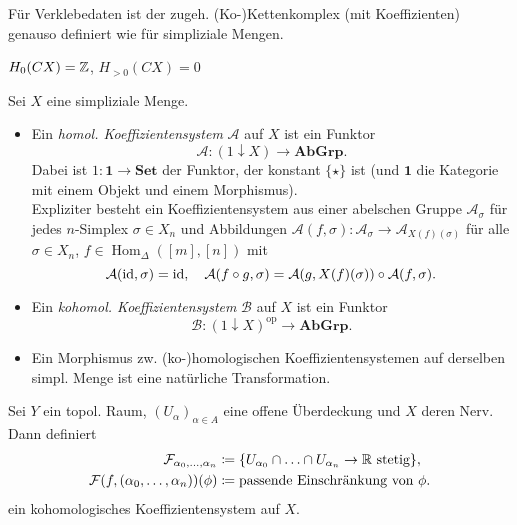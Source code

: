 \documentclass{cheat-sheet}
\newcommand{\SetC}{\mathbf{Set}} %
\newcommand{\AbGrp}{\mathbf{AbGrp}} %
\newcommand{\op}{\mathrm{op}} %
\DeclareMathOperator{\Hom}{Hom} %
\begin{document}
\begin{defn}
  Für Verklebedaten ist der zugeh. (Ko-)Kettenkomplex (mit Koeffizienten) genauso definiert wie für simpliziale Mengen.
\end{defn}

\begin{prop}
  $H_0(CX) = \mathbb{Z}$, $H_{>0}(CX) = 0$
\end{prop}



\begin{defn}
  Sei $X$ eine simpliziale Menge.
  \begin{itemize}
    \item Ein \emph{homol. Koeffizientensystem} $\mathcal{A}$ auf $X$ ist ein Funktor
    \[ \mathcal{A} : (1 \downarrow X) \to \AbGrp. \]
    Dabei ist $1 : \mathbf{1} \to \SetC$ der Funktor, der konstant $\{ \star \}$ ist (und $\mathbf{1}$ die Kategorie mit einem Objekt und einem Morphismus).\\
    Expliziter besteht ein Koeffizientensystem aus einer abelschen Gruppe $\mathcal{A}_\sigma$ für jedes $n$-Simplex $\sigma \in X_n$ und Abbildungen $\mathcal{A}(f, \sigma) : \mathcal{A}_\sigma \to \mathcal{A}_{X(f)(\sigma)}$ für alle $\sigma \in X_n$, $f \in \Hom_{\Delta}([m], [n])$ mit
    \[
      \mathcal{A}(\operatorname{id}, \sigma) = \operatorname{id}, \quad
      \mathcal{A}(f \circ g, \sigma) = \mathcal{A}(g, X(f)(\sigma)) \circ \mathcal{A}(f, \sigma).
    \]
    \item Ein \emph{kohomol. Koeffizientensystem} $\mathcal{B}$ auf $X$ ist ein Funktor
    \[ \mathcal{B} : (1 \downarrow X)^\op \to \AbGrp. \]
    \item Ein Morphismus zw. (ko-)homologischen Koeffizientensystemen auf derselben simpl. Menge ist eine natürliche Transformation.
  \end{itemize}
\end{defn}


\begin{bsp}
  Sei $Y$ ein topol. Raum, $(U_\alpha)_{\alpha \in A}$ eine offene Überdeckung und $X$ deren Nerv. Dann definiert
  \begin{align*}
    \mathcal{F}_{\alpha_0, \ldots, \alpha_n} & \coloneqq \{ U_{\alpha_0} \cap \ldots \cap U_{\alpha_n} \to \mathbb{R} \text{ stetig} \}, \\
    \mathcal{F}(f, (\alpha_0, \ldots, \alpha_n))(\phi) & \coloneqq \text{passende Einschränkung von $\phi$}.
  \end{align*}
  ein kohomologisches Koeffizientensystem auf $X$.
\end{bsp}
\end{document}
